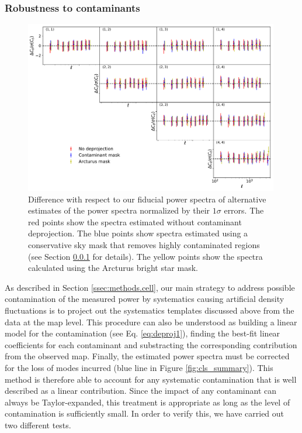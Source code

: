 \documentclass[a4paper,11pt]{article}
\begin{document}
    \subsubsection{Robustness to contaminants} \label{sssec:results.spectra.syst}
      \begin{figure}
        \centering
        \includegraphics[width=0.99\textwidth]{figures/cls_systematics.pdf}
        \caption{Difference with respect to our fiducial power spectra of alternative estimates of the power spectra normalized by their $1\sigma$ errors. The red points show the spectra estimated without contaminant deprojection. The blue points show spectra estimated using a conservative sky mask that removes highly contaminated regions (see Section \ref{sssec:results.spectra.syst} for details). The yellow points show the spectra calculated using the Arcturus bright star mask.}
        \label{fig:cls_systematics}
      \end{figure}
      As described in Section \ref{ssec:methods.cell}, our main strategy to address possible contamination of the measured power by systematics causing artificial density fluctuations is to project out the systematics templates discussed above from the data at the map level. This procedure can also be understood as building a linear model for the contamination (see Eq. \ref{eq:deproj1}), finding the best-fit linear coefficients for each contaminant and substracting the corresponding contribution from the observed map. Finally, the estimated power spectra must be corrected for the loss of modes incurred (blue line in Figure \ref{fig:cls_summary}). This method is therefore able to account for any systematic contamination that is well described as a linear contribution. Since the impact of any contaminant can always be Taylor-expanded, this treatment is appropriate as long as the level of contamination is sufficiently small. In order to verify this, we have carried out two different tests.
      
\end{document}
